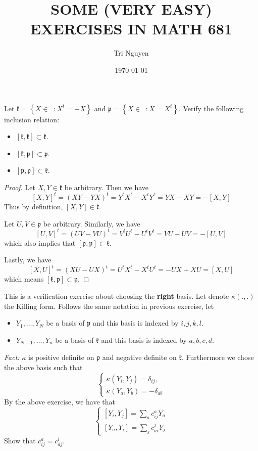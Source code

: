 \documentclass[12pt]{article} %
\title{SOME (VERY EASY) EXERCISES IN MATH 681} %
\author{Tri Nguyen} %
\date{\today} %
\DeclareMathOperator{\sln}{\mathfrak{sl}_n(\mathbb{R})}
\begin{document}
\maketitle %
\begin{tcolorbox}[colback=blue!5!white,colframe=blue!75!black,title=Problem 1]
  Let $\mathfrak{k} = \left\lbrace X \in \sln : X^t = -X \right\rbrace $ and $ \mathfrak{p } = \left\lbrace X \in \sln: X=X^t\right\rbrace$.
  Verify the following inclusion relation:
  \begin{itemize}
    \item $[\mathfrak{k},\mathfrak{k}] \subset \mathfrak{k}$.
    \item  $[\mathfrak{k},\mathfrak{p}] \subset \mathfrak{p}$.
    \item  $[\mathfrak{p},\mathfrak{p}] \subset \mathfrak{k}$.
  \end{itemize}
\end{tcolorbox}
\begin{proof}
  \hfill

  Let $X,Y \in \mathfrak{k}$ be arbitrary. Then we have
  \[ [X,Y]^t= \left(XY-YX\right)^t=Y^tX^t-X^tY^t=YX-XY = -[X,Y]\]
  Thus by definition, $[X,Y] \in \mathfrak{k}$.

  Let $U,V \in \mathfrak{p}$ be arbitrary. Similarly, we have
  \[[U,V]^t = (UV - VU)^t= V^tU^t- U^tV^t = VU - UV = -[U,V]\]
  which also implies that $[\mathfrak{p},\mathfrak{p}] \subset \mathfrak{k}$.

  Lastly, we have
  \[[X,U]^t = (XU-UX)^t = U^tX^t-X^tU^t = -UX+XU=[X,U]\]
  which means  $[\mathfrak{k},\mathfrak{p}] \subset \mathfrak{p}$.
\end{proof}
\begin{tcolorbox}[colback=blue!5!white,colframe=blue!75!black,title=Problem 2]
  This is a verification exercise about choosing the \textbf{right} basis. Let denote $\kappa(.,.)$
  the Killing form. Follows the same notation in previous exercise, let
  \begin{itemize}
    \item $Y_1,\ldots, Y_N$ be a basis of $\mathfrak{p}$ and this basis is indexed by $i,j,k,l$.
    \item $Y_{N+1},\ldots, Y_n$ be a basis of $\mathfrak{k}$ and this basis is indexed by $a,b,c,d$.
  \end{itemize}
  \textit{Fact: } $\kappa$ is positive definite on $\mathfrak{p}$ and negative definite on $\mathfrak{k}$. Furthermore
  we chose the above basis such that
  \[\begin{cases}
      \kappa(Y_i,Y_j) = \delta_{ij}, \\
      \kappa (Y_a,Y_b) = -\delta_{ab}
    \end{cases}\]
  By the above exercise, we have that
  \[\begin{cases}
      [Y_i,Y_j] = \sum_{a} c^a_{ij}Y_a \\
      [Y_a,Y_i] = \sum_{j} c_{ai}^j Y_j
    \end{cases}\]
  Show that $c^a_{ij} = c^i_{aj}$.
\end{tcolorbox}
\end{document}
